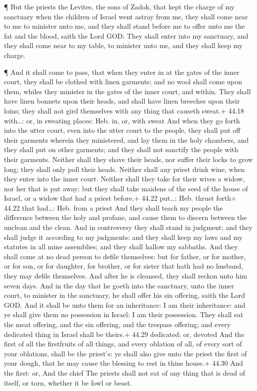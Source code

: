 ¶ But the priests the Levites, the sons of Zadok, that
kept the charge of my sanctuary when the children of Israel went astray
from me, they shall come near to me to minister unto me, and they shall
stand before me to offer unto me the fat and the blood, saith the Lord
GOD:  They shall enter into my sanctuary, and they shall
come near to my table, to minister unto me, and they shall keep my
charge.

 ¶ And it shall come to pass, that when they enter in at
the gates of the inner court, they shall be clothed with linen garments;
and no wool shall come upon them, whiles they minister in the gates of
the inner court, and within.  They shall have linen bonnets
upon their heads, and shall have linen breeches upon their loins; they
shall not gird themselves with any thing that causeth sweat.+ 44.18
with\ldots: or, in sweating places: Heb. in, or, with sweat
 And when they go forth into the utter court, even into the
utter court to the people, they shall put off their garments wherein
they ministered, and lay them in the holy chambers, and they shall put
on other garments; and they shall not sanctify the people with their
garments.  Neither shall they shave their heads, nor suffer
their locks to grow long; they shall only poll their heads.
 Neither shall any priest drink wine, when they enter into
the inner court.  Neither shall they take for their wives a
widow, nor her that is put away: but they shall take maidens of the seed
of the house of Israel, or a widow that had a priest before.+ 44.22
put\ldots: Heb. thrust forth+ 44.22 that had\ldots: Heb. from a priest
 And they shall teach my people the difference between the
holy and profane, and cause them to discern between the unclean and the
clean.  And in controversy they shall stand in judgment;
and they shall judge it according to my judgments: and they shall keep
my laws and my statutes in all mine assemblies; and they shall hallow my
sabbaths.  And they shall come at no dead person to defile
themselves: but for father, or for mother, or for son, or for daughter,
for brother, or for sister that hath had no husband, they may defile
themselves.  And after he is cleansed, they shall reckon
unto him seven days.  And in the day that he goeth into the
sanctuary, unto the inner court, to minister in the sanctuary, he shall
offer his sin offering, saith the Lord GOD.  And it shall
be unto them for an inheritance: I am their inheritance: and ye shall
give them no possession in Israel: I am their possession. 
They shall eat the meat offering, and the sin offering, and the trespass
offering; and every dedicated thing in Israel shall be theirs.+ 44.29
dedicated: or, devoted  And the first of all the
firstfruits of all things, and every oblation of all, of every sort of
your oblations, shall be the priest's: ye shall also give unto the
priest the first of your dough, that he may cause the blessing to rest
in thine house.+ 44.30 And the first: or, And the chief 
The priests shall not eat of any thing that is dead of itself, or torn,
whether it be fowl or beast.

